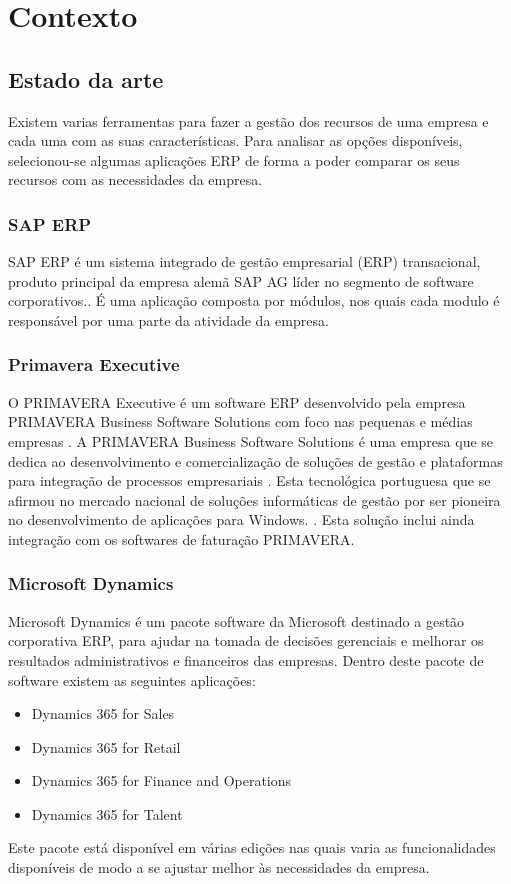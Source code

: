 \chapter{Contexto} 
\label{cap:2}

\section{Estado da arte}
Existem varias ferramentas para fazer a gestão dos recursos de uma empresa e cada uma com as suas características. Para analisar as opções disponíveis, selecionou-se algumas aplicações ERP de forma a poder comparar os seus recursos com as necessidades da empresa.

\subsection{SAP ERP}
SAP ERP  é um sistema integrado de gestão empresarial (ERP) transacional, produto principal da empresa alemã SAP AG líder no segmento de software corporativos.\cite{Wikipediab}. É uma aplicação composta por módulos, nos quais cada modulo é responsável por uma parte da atividade da empresa.


\subsection{Primavera Executive}
O PRIMAVERA Executive é um software ERP desenvolvido pela empresa PRIMAVERA Business Software Solutions com foco nas pequenas e médias empresas \cite{PRIMAVERABSS}. A PRIMAVERA Business Software Solutions é uma empresa que se dedica ao desenvolvimento e comercialização de soluções de gestão e plataformas para integração de processos empresariais \cite{Wikipediaa}. Esta tecnológica portuguesa que se afirmou no mercado nacional de soluções informáticas de gestão por ser pioneira no desenvolvimento de aplicações para Windows. \cite{Wikipediaa}.
Esta solução inclui ainda integração com os softwares de faturação PRIMAVERA.

\subsection{Microsoft Dynamics}
Microsoft Dynamics é um pacote software da Microsoft destinado a gestão corporativa ERP, para ajudar na tomada de decisões gerenciais e melhorar os resultados administrativos e financeiros das empresas.\cite{Wikipediac}
Dentro deste pacote de software existem as seguintes aplicações:
\begin{itemize}
	\item Dynamics 365 for Sales
	\item Dynamics 365 for Retail
	\item Dynamics 365 for Finance and Operations
	\item Dynamics 365 for Talent
\end{itemize}
Este pacote está disponível em várias edições nas quais varia as funcionalidades disponíveis de modo a se ajustar melhor às necessidades da empresa.

